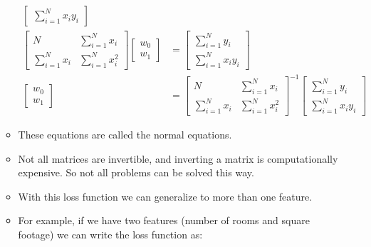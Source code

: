 \documentclass[12pt]{article}
\begin{document}
\begin{itemize}
\begin{itemize}
\begin{align*}
\begin{bmatrix}
                                \sum_{i=1}^N {x_i}y_i
                            \end{bmatrix}\\
                            \begin{bmatrix}
                                N & \sum_{i=1}^N x_i\\
                                \sum_{i=1}^N x_i & \sum_{i=1}^N x_i^2
                            \end{bmatrix} \begin{bmatrix}
                                w_0\\
                                w_1
                            \end{bmatrix} &= \begin{bmatrix}
                                \sum_{i=1}^N y_i\\
                                \sum_{i=1}^N {x_i}y_i
                            \end{bmatrix}\\
                            \begin{bmatrix}
                                w_0\\
                                w_1
                            \end{bmatrix} &= \begin{bmatrix}
                                N & \sum_{i=1}^N x_i\\
                                \sum_{i=1}^N x_i & \sum_{i=1}^N x_i^2
                            \end{bmatrix}^{-1} \begin{bmatrix}
                                \sum_{i=1}^N y_i\\
                                \sum_{i=1}^N {x_i}y_i
                            \end{bmatrix}
                        \end{align*}
                        \item These equations are called the normal equations.
                        \item Not all matrices are invertible, and inverting a matrix is computationally expensive. So not all problems can be solved this way.
                        \item With this loss function we can generalize to more than one feature.
                        \item For example, if we have two features (number of rooms and square footage) we can write the loss function as:

\end{itemize}
\end{itemize}
\end{document}
